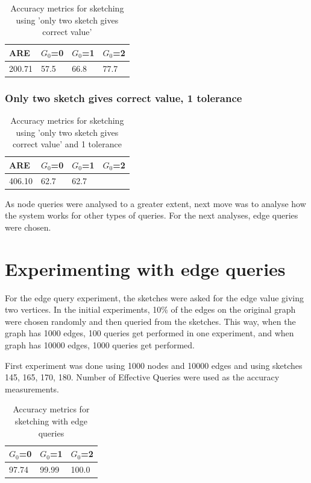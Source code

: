 \documentclass[12pt]{report}
\numberwithin{figure}{section}
\numberwithin{table}{section}
\begin{document}
\begin{table}[H]
\centering
\begin{tabular}{|l|l|l|l|}
\hline
 ARE   & $G_0$=0 & $G_0$=1 & $G_0$=2 \\ \hline
200.71 &   57.5  &   66.8  &   77.7  \\ \hline
\end{tabular}
\caption{Accuracy metrics for sketching using 'only two sketch gives correct value'}
\end{table}

\subsubsection{Only two sketch gives correct value, 1 tolerance}

\begin{table}[H]
\centering
\begin{tabular}{|l|l|l|l|}
\hline
 ARE   & $G_0$=0 & $G_0$=1 & $G_0$=2 \\ \hline
406.10 &   62.7  &   62.7  &     \\ \hline
\end{tabular}
\caption{Accuracy metrics for sketching using 'only two sketch gives correct value' and 1 tolerance}
\end{table}

As node queries were analysed to a greater extent, next move was to analyse how the system works for other types of queries. For the next analyses, edge queries were chosen.

\section{Experimenting with edge queries}

For the edge query experiment, the sketches were asked for the edge value giving two vertices. In the initial experiments, 10\% of the edges on the original graph were chosen randomly and then queried from the sketches. This way, when the graph has 1000 edges, 100 queries get performed in one experiment, and when graph has 10000 edges, 1000 queries get performed.

First experiment was done using 1000 nodes and 10000 edges and using sketches 145, 165, 170, 180. Number of Effective Queries were used as the accuracy measurements.

\begin{table}[H]
\centering
\begin{tabular}{|l|l|l|}
\hline
$G_0$=0 & $G_0$=1 & $G_0$=2 \\ \hline
97.74  &   99.99  &   100.0\\ \hline
\end{tabular}
\caption{Accuracy metrics for sketching with edge queries}
\end{table}
\end{document}
